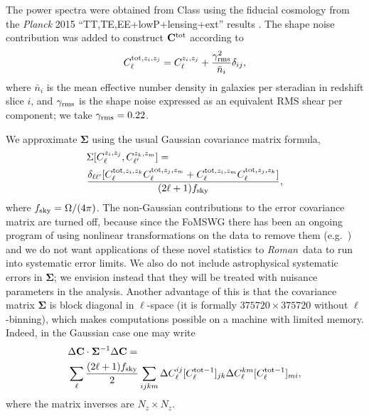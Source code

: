 \documentclass[usenatbib]{mnras}
\newcommand{\wfirst}{{\slshape Roman}}
\begin{document}
The power spectra were obtained from {\sc Class}
\citep{2011JCAP...07..034B} using the fiducial cosmology from the
{\slshape Planck} 2015 ``TT,TE,EE+lowP+lensing+ext'' results
\citep{2016A&A...594A..13P}. The shape noise contribution was added to
construct ${\bf C}^{\rm tot}$ according to
\begin{equation}
C^{{\rm tot},z_i,z_j}_\ell = C^{z_i,z_j}_\ell + \frac{\gamma_{\rm rms}^2}{\bar n_i}\delta_{ij},
\end{equation}
where $\bar n_i$ is the mean effective number density in galaxies per
steradian in redshift slice $i$, and $\gamma_{\rm rms}$ is the shape
noise expressed as an equivalent RMS shear per component; we take
$\gamma_{\rm rms} = 0.22$.

We approximate ${\boldsymbol\Sigma}$ using the usual Gaussian
covariance matrix formula,
\begin{align}
&\Sigma[C^{z_i,z_j}_\ell, C^{z_k,z_m}_{\ell'}]= \nonumber\\
& \frac{\delta_{\ell\ell'} [ C^{{\rm tot},z_i,z_k}_\ell C^{{\rm tot},z_j,z_m}_\ell + C^{{\rm tot},z_i,z_m}_\ell C^{{\rm tot},z_j,z_k}_\ell]}{(2\ell+1)f_{\rm sky}} ,
\label{eq:SGauss}
\end{align}
where $f_{\rm sky} = \Omega/(4\pi)$.  The non-Gaussian contributions
to the error covariance matrix are turned off, because since the
FoMSWG \citep{2009arXiv0901.0721A} there has been an ongoing program of
using nonlinear transformations on the data to remove them (e.g.\
\cite{2009ApJ...698L..90N, 2011ApJ...729L..11S}) and
we do not want applications of these novel statistics to \wfirst\ data
to run into systematic error limits. We also do not include astrophysical systematic errors in ${\boldsymbol\Sigma}$; we envision instead that they will be treated with nuisance parameters in the analysis. Another advantage of this is that the covariance matrix ${\boldsymbol\Sigma}$ is block diagonal in $\ell$-space (it is formally $375720\times375720$ without $\ell$-binning), which makes computations possible on a machine with limited memory. Indeed, in the Gaussian case one may write
\begin{align}
&\Delta{\bf C} \cdot {\boldsymbol\Sigma}^{-1} \Delta {\bf C}=\nonumber\\
& \sum_\ell \frac{(2\ell+1)f_{\rm sky}}2 \sum_{ijkm}
 \Delta C_\ell^{ij} [C^{{\rm tot}-1}_\ell]_{jk}
 \Delta C_\ell^{km} [C^{{\rm tot}-1}_\ell]_{mi},
\label{eq:sprodform}
\end{align}
where the matrix inverses are $N_z\times N_z$.
\end{document}
